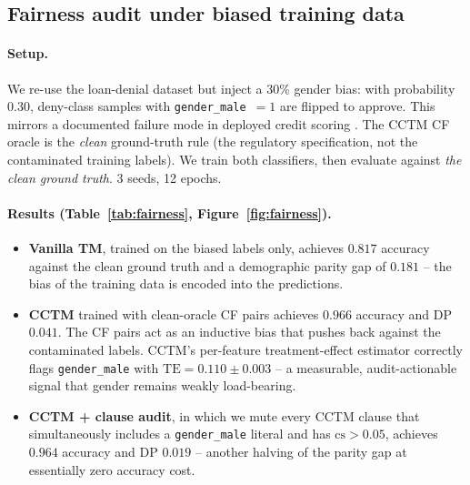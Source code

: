 \documentclass[11pt]{article}
\begin{document}
\subsection{Fairness audit under biased training data}

\paragraph{Setup.}  We re-use the loan-denial dataset but inject a 30\% gender bias: with probability $0.30$, deny-class samples with \texttt{gender\_male}~$=1$ are flipped to approve.  This mirrors a documented failure mode in deployed credit scoring \citep{barocas2017fairness}.  The CCTM CF oracle is the \emph{clean} ground-truth rule (the regulatory specification, not the contaminated training labels).  We train both classifiers, then evaluate against \emph{the clean ground truth}.  3 seeds, 12 epochs.

\paragraph{Results (Table~\ref{tab:fairness}, Figure~\ref{fig:fairness}).}

\begin{itemize}[leftmargin=2em]
\item \textbf{Vanilla TM}, trained on the biased labels only, achieves $\mathbf{0.817}$ accuracy against the clean ground truth and a demographic parity gap of $\mathbf{0.181}$ -- the bias of the training data is encoded into the predictions.
\item \textbf{CCTM} trained with clean-oracle CF pairs achieves $\mathbf{0.966}$ accuracy and DP $0.041$.  The CF pairs act as an inductive bias that pushes back against the contaminated labels.  CCTM's per-feature treatment-effect estimator correctly flags \texttt{gender\_male} with $\mathrm{TE} = 0.110 \pm 0.003$ -- a measurable, audit-actionable signal that gender remains weakly load-bearing.
\item \textbf{CCTM + clause audit}, in which we mute every CCTM clause that simultaneously includes a \texttt{gender\_male} literal and has $\mathrm{cs} > 0.05$, achieves $\mathbf{0.964}$ accuracy and DP $\mathbf{0.019}$ -- another halving of the parity gap at essentially zero accuracy cost.
\end{itemize}
\end{document}
